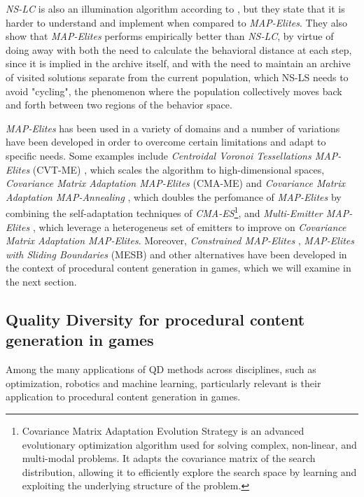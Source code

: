 \documentclass{Configuration_Files/PoliMi3i_thesis}
\begin{document}
\textit{NS-LC} is also an illumination algorithm according to \citeauthor{mouret_illuminating_2015}, but they state that it is harder to understand and implement when compared to \textit{MAP-Elites}. They also show that \textit{MAP-Elites} performs empirically better than \textit{NS-LC}, by virtue of doing away with both the need to calculate the behavioral distance at each step, since it is implied in the archive itself, and with the need to maintain an archive of visited solutions separate from the current population, which NS-LS needs to avoid "cycling", the phenomenon where the population collectively moves back and forth between two regions of the behavior space. \cite{mouret_illuminating_2015}

\textit{MAP-Elites} has been used in a variety of domains and a number of variations have been developed in order to overcome certain limitations and adapt to specific needs. Some examples include \textit{Centroidal Voronoi Tessellations MAP-Elites} (CVT-ME) \cite{vassiliades_using_2017}, which scales the algorithm to high-dimensional spaces, \textit{Covariance Matrix Adaptation MAP-Elites} (CMA-ME) \cite{fontaine_covariance_2020} and \textit{Covariance Matrix Adaptation MAP-Annealing} \cite{fontaine_covariance_2022}, which doubles the perfomance of \textit{MAP-Elites} by combining the self-adaptation techniques of \textit{CMA-ES}\footnote{Covariance Matrix Adaptation Evolution Strategy is an advanced evolutionary optimization algorithm used for solving complex, non-linear, and multi-modal problems. It adapts the covariance matrix of the search distribution, allowing it to efficiently explore the search space by learning and exploiting the underlying structure of the problem.}, and \textit{Multi-Emitter MAP-Elites} \cite{cully_multi-emitter_2021}, which leverage a heterogeneus set of emitters to improve on \textit{Covariance Matrix Adaptation MAP-Elites}. Moreover, \textit{Constrained MAP-Elites} \cite{khalifa_talakat_2018}, \textit{MAP-Elites with Sliding Boundaries} (MESB) \cite{fontaine_mapping_2019} and other alternatives have been developed in the context of procedural content generation in games, which we will examine in the next section.

\subsection{Quality Diversity for procedural content generation in games}
\label{subsec:qd_pcg}
Among the many applications of QD methods across disciplines, such as optimization, robotics and machine learning, particularly relevant is their application to procedural content generation in games.
\end{document}

